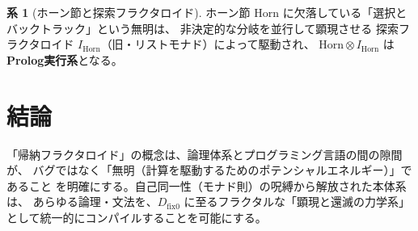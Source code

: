 \documentclass[11pt,a4paper]{article}
\theoremstyle{definition}
\newtheorem{corollary}{系}[section]
\newcommand{\dfix}{D_{\mathrm{fix}0}} %
\begin{document}
\begin{corollary}[ホーン節と探索フラクタロイド]
ホーン節 $\mathrm{Horn}$ に欠落している「選択とバックトラック」という無明は、
非決定的な分岐を並行して顕現させる
探索フラクタロイド $I_{\mathrm{Horn}}$（旧・リストモナド）によって駆動され、
$\mathrm{Horn} \otimes I_{\mathrm{Horn}}$ は\textbf{Prolog実行系}となる。
\end{corollary}

\section*{結論}

「帰納フラクタロイド」の概念は、論理体系とプログラミング言語の間の隙間が、
バグではなく「無明（計算を駆動するためのポテンシャルエネルギー）」であること
を明確にする。自己同一性（モナド則）の呪縛から解放された本体系は、
あらゆる論理・文法を、$\dfix$ に至るフラクタルな「顕現と還滅の力学系」
として統一的にコンパイルすることを可能にする。
\end{document}
